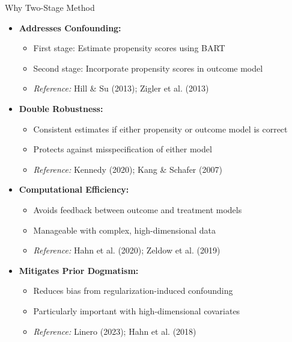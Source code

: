 \documentclass{beamer}
\begin{document}
\begin{frame}{Why Two-Stage Method}
\begin{itemize}
    \item \textbf{Addresses Confounding:}
    \begin{itemize}
        \item First stage: Estimate propensity scores using BART
        \item Second stage: Incorporate propensity scores in outcome model
        \item \textit{Reference:} Hill \& Su (2013); Zigler et al. (2013)
    \end{itemize}
    \item \textbf{Double Robustness:}
    \begin{itemize}
        \item Consistent estimates if either propensity or outcome model is correct
        \item Protects against misspecification of either model
        \item \textit{Reference:} Kennedy (2020); Kang \& Schafer (2007)
    \end{itemize}
    \item \textbf{Computational Efficiency:}
    \begin{itemize}
        \item Avoids feedback between outcome and treatment models
        \item Manageable with complex, high-dimensional data
        \item \textit{Reference:} Hahn et al. (2020); Zeldow et al. (2019)
    \end{itemize}
    \item \textbf{Mitigates Prior Dogmatism:}
    \begin{itemize}
        \item Reduces bias from regularization-induced confounding
        \item Particularly important with high-dimensional covariates
        \item \textit{Reference:} Linero (2023); Hahn et al. (2018)
    \end{itemize}
\end{itemize}
\end{frame}
\end{document}
